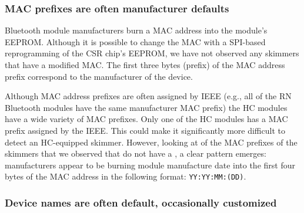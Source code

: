 \subsubsection*{MAC prefixes are often manufacturer defaults}

Bluetooth module manufacturers burn a MAC address into the module's EEPROM.
%
Although it is possible to change the MAC with a SPI-based
reprogramming of the CSR chip's EEPROM, we have not observed any skimmers that have a modified MAC.
%
The first three bytes (prefix) of the MAC address prefix correspond to the
manufacturer of the device. 
%
 
Although MAC address prefixes are often assigned by IEEE (e.g., all of the RN Bluetooth modules have the same manufacturer MAC prefix) the HC modules have a wide
%
variety of MAC prefixes.
%
Only one of the HC modules has a MAC prefix assigned by the IEEE.
% 
This could make it significantly more difficult to detect an HC-equipped
skimmer.
%
However, looking at of the MAC prefixes of the skimmers that we observed that do not have a , a clear pattern
emerges: manufacturers appear to be burning module manufacture date into
the first four bytes of the MAC address in the following format:
\texttt{YY:YY:MM:(DD)}.
%


\subsubsection*{Device names are often default, occasionally customized}

